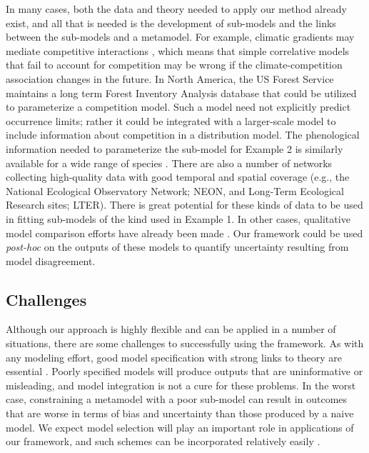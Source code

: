 \documentclass[11pt]{article}
\begin{document}
In many cases, both the data and theory needed to apply our method already exist, and all that is needed is the development of sub-models and the links between the sub-models and a metamodel.
For example, climatic gradients may mediate competitive interactions \citep{Kunstler2011}, which means that simple correlative models that fail to account for competition may be wrong if the climate-competition association changes in the future.
In North America, the US Forest Service maintains a long term Forest Inventory Analysis database that could be utilized to parameterize a competition model.
Such a model need not explicitly predict occurrence limits; rather it could be integrated with a larger-scale model to include information about competition in a distribution model.
The phenological information needed to parameterize the sub-model for Example 2 is similarly available for a wide range of species \citep{Morin2009}.
There are also a number of networks collecting high-quality data with good temporal and spatial coverage (e.g., the National Ecological Observatory Network; NEON, and Long-Term Ecological Research sites; LTER).
There is great potential for these kinds of data to be used in fitting sub-models of the kind used in Example 1.
In other cases, qualitative model comparison efforts have already been made \citep{Morin2009, Cheaib2012}.
Our framework could be used \emph{post-hoc} on the outputs of these models to quantify uncertainty resulting from model disagreement.


\subsection*{Challenges} 
Although our approach is highly flexible and can be applied in a number of situations, there are some challenges to successfully using the framework.
As with any modeling effort, good model specification with strong links to theory are essential \citep{Austin2007}.
Poorly specified models will produce outputs that are uninformative or misleading, and model integration is not a cure for these problems.
In the worst case, constraining a metamodel with a poor sub-model can result in outcomes that are worse in terms of bias and uncertainty than those produced by a naive model.
We expect model selection will play an important role in applications of our framework, and such schemes can be incorporated relatively easily \citep{Madigan1995, Wasserman2000, Tenan2014}.
\end{document}
